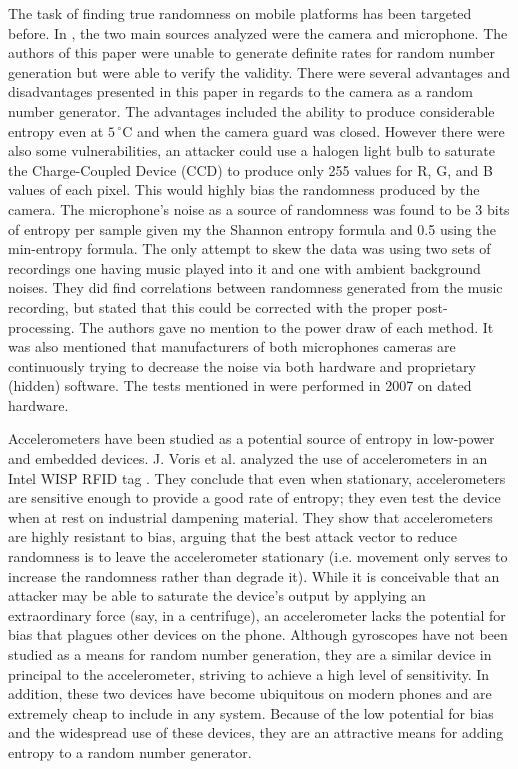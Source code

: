 \documentclass[conference]{IEEEtran}
\begin{document}
The task of finding true randomness on mobile platforms has been targeted before. In \cite{Krhovjak}, the two main sources analyzed were the 
camera and microphone. The authors of this paper were unable to generate definite rates for random number generation but were able to verify the validity.
There were several advantages and disadvantages presented in this paper in regards to the camera as a random number generator. The advantages included the
ability to produce considerable entropy even at $5\,^{\circ}\mathrm{C}$ and when the camera guard was closed. However there were also some vulnerabilities, 
an attacker could use a halogen light bulb to saturate the Charge-Coupled
Device (CCD) to produce only 255 values for R, G, and B values of each pixel. This would highly bias the randomness produced by the camera. 
The microphone's noise as a source of randomness was found to be 3 bits of entropy per sample given my the Shannon entropy formula and 0.5 using the min-entropy 
formula. The only attempt to skew the data was using two sets of recordings one having music played into it and one with ambient background noises. They did
find correlations between randomness generated from the music recording, but stated that this could be corrected with the proper post-processing. The authors
gave no mention to the power draw of each method. It was also mentioned that manufacturers of both microphones cameras are continuously trying to decrease the noise
via both hardware and proprietary (hidden) software. The tests mentioned in \cite{Krhovjak} were performed in 2007 on dated hardware.



Accelerometers have been studied as a potential source of entropy in low-power and embedded devices.  J. Voris et al. analyzed the use of accelerometers in an
Intel WISP RFID tag \cite{voris}.  They conclude that even when stationary, accelerometers are sensitive enough to provide a good rate of entropy; they even
test the device when at rest on industrial dampening material.  They show that accelerometers are highly resistant to bias, arguing that the best attack
vector to reduce randomness is to leave the accelerometer stationary (i.e. movement only serves to increase the randomness rather than degrade it).  While it is
conceivable that an attacker may be able to saturate the device's output by applying an extraordinary force (say, in a centrifuge), an accelerometer lacks the
potential for bias that plagues other devices on the phone.  Although gyroscopes have not been studied as a means for random number generation, they are a
similar device in principal to the accelerometer, striving to achieve a high level of sensitivity.  In addition, these two devices have become ubiquitous on
modern phones and are extremely cheap to include in any system.  Because of the low potential for bias and the widespread use of these devices, they are an
attractive means for adding entropy to a random number generator.
\end{document}
